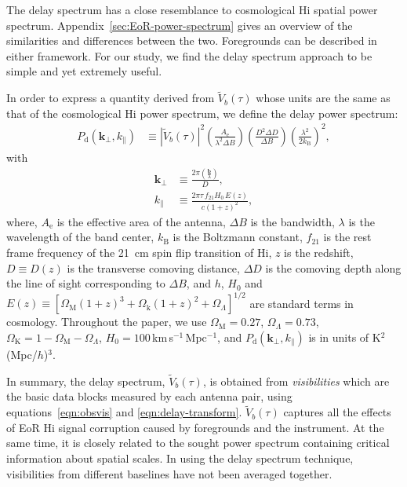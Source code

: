 \documentclass[preprint2,iop,numberedappendix,twocolappendix,appendixfloats]{emulateapj}
\begin{document}
The delay spectrum has a close resemblance to cosmological H{\sc i} spatial power spectrum. Appendix~\ref{sec:EoR-power-spectrum} gives an overview of the similarities and differences between the two. Foregrounds can be described in either framework. For our study, we find the delay spectrum approach to be simple and yet extremely useful. 

In order to express a quantity derived from $\tilde{V}_b(\tau)$ whose units are the same as that of the cosmological H{\sc i} power spectrum, we define the delay power spectrum:
\begin{align}\label{eqn:delay-power-spectrum}
  P_\textrm{d}(\boldsymbol{k}_\perp,k_\parallel) &\equiv |\tilde{V}_b(\tau)|^2\left(\frac{A_\textrm{e}}{\lambda^2\Delta B}\right)\left(\frac{D^2\Delta D}{\Delta B}\right)\left(\frac{\lambda^2}{2k_\textrm{B}}\right)^2,
\end{align}
with
\begin{align}
  \boldsymbol{k}_\perp &\equiv \frac{2\pi(\frac{\boldsymbol{b}}{\lambda})}{D}, \\
  k_\parallel &\equiv \frac{2\pi\tau\,f_{21}H_0\,E(z)}{c(1+z)^2}, 
\end{align}
where, $A_\textrm{e}$ is the effective area of the antenna, $\Delta B$ is the bandwidth, $\lambda$ is the wavelength of the band center, $k_\textrm{B}$ is the Boltzmann constant, $f_{21}$ is the rest frame frequency of the 21~cm spin flip transition of H{\sc i}, $z$ is the redshift, $D\equiv D(z)$ is the transverse comoving distance, $\Delta D$ is the comoving depth along the line of sight corresponding to $\Delta B$, and $h$, $H_0$ and $E(z)\equiv [\Omega_\textrm{M}(1+z)^3+\Omega_\textrm{k}(1+z)^2+\Omega_\Lambda]^{1/2}$ are standard terms in cosmology. Throughout the paper, we use $\Omega_\textrm{M}=0.27$, $\Omega_\Lambda=0.73$, $\Omega_\textrm{K}=1-\Omega_\textrm{M}-\Omega_\Lambda$, $H_0=100\,$km$\,$s$^{-1}\,$Mpc$^{-1}$, and $P_\textrm{d}(\boldsymbol{k}_\perp,k_\parallel)$ is in units of K$^2$(Mpc/$h$)$^3$.

In summary, the delay spectrum, $\tilde{V}_b(\tau)$, is obtained from {\it visibilities} which are the basic data blocks measured by each antenna pair, using equations~\ref{eqn:obsvis} and \ref{eqn:delay-transform}. $\tilde{V}_b(\tau)$ captures all the effects of EoR H{\sc i} signal corruption caused by foregrounds and the instrument. At the same time, it is closely related to the sought power spectrum containing critical information about spatial scales. In using the delay spectrum technique, visibilities from different baselines have not been averaged together. 
\end{document}
